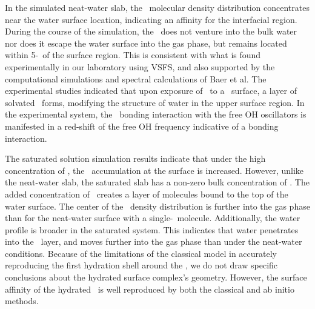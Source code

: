 \documentclass{article}
\begin{document}


In the simulated neat-water slab, the \suldiox~molecular density distribution concentrates near the water surface location, indicating an affinity for the interfacial region. During the course of the simulation, the \suldiox~does not venture into the bulk water nor does it escape the water surface into the gas phase, but remains located within 5-\angs~of the surface region. This is consistent with what is found experimentally in our laboratory using VSFS,\cite{Tarbuck2005,Tarbuck2006} and also supported by the computational simulations and spectral calculations of Baer et al.\cite{Baer2010} The experimental studies indicated that upon exposure of \suldiox~to a \wat~surface, a layer of solvated \suldiox~forms, modifying the structure of water in the upper surface region. In the experimental system, the \suldiox~bonding interaction with the free OH oscillators is manifested in a red-shift of the free OH frequency indicative of a bonding interaction. 

The saturated solution simulation results indicate that under the high concentration of \suldiox, the \suldiox~accumulation at the surface is increased. However, unlike the neat-water slab, the saturated slab has a non-zero bulk concentration of \suldiox. The added concentration of \suldiox~creates a layer of molecules bound to the top of the water surface. The center of the \suldiox~density distribution is further into the gas phase than for the neat-water surface with a single-\suldiox~molecule. Additionally, the water profile is broader in the saturated system. This indicates that water penetrates into the \suldiox~layer, and moves further into the gas phase than under the neat-water conditions. Because of the limitations of the classical model in accurately reproducing the first hydration shell around the \suldiox, we do not draw specific conclusions about the hydrated surface complex's geometry. However, the surface affinity of the hydrated \suldiox~is well reproduced by both the classical and ab initio methods.\cite{Baer2010}
\end{document}
